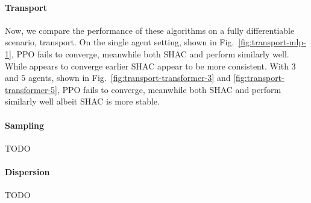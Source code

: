 \paragraph{Transport}
Now, we compare the performance of these algorithms on a fully differentiable scenario, transport. On the single agent setting, shown in Fig.~\ref{fig:transport-mlp-1}, PPO fails to converge, meanwhile both SHAC and \fname{} perform similarly well. While \fname{} appears to converge earlier SHAC appear to be more consistent. With $3$ and $5$ agents, shown in Fig.~\ref{fig:transport-transformer-3} and \ref{fig:transport-transformer-5}, PPO fails to converge, meanwhile both SHAC and \fname{} perform similarly well albeit SHAC is more stable. 

\paragraph{Sampling}
TODO

\paragraph{Dispersion}
TODO
